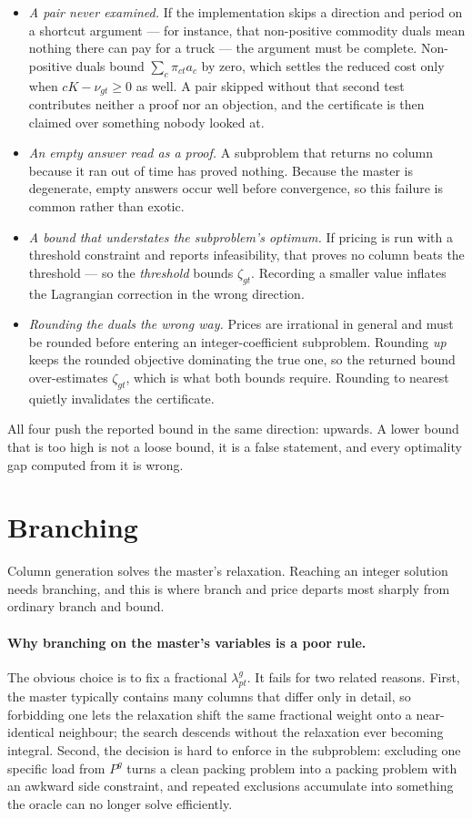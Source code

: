 \documentclass[11pt,a4paper]{article}
\begin{document}
\begin{itemize}[leftmargin=1.4em]
\item \emph{A pair never examined.} If the implementation skips a direction and
period on a shortcut argument --- for instance, that non-positive commodity
duals mean nothing there can pay for a truck --- the argument must be complete.
Non-positive duals bound $\sum_{c}\pi_{ct}a_{c}$ by zero, which settles the
reduced cost only when $cK-\nu_{gt}\ge 0$ as well. A pair skipped without that
second test contributes neither a proof nor an objection, and the certificate is
then claimed over something nobody looked at.
\item \emph{An empty answer read as a proof.} A subproblem that returns no
column because it ran out of time has proved nothing. Because the master is
degenerate, empty answers occur well before convergence, so this failure is
common rather than exotic.
\item \emph{A bound that understates the subproblem's optimum.} If pricing is
run with a threshold constraint and reports infeasibility, that proves no column
beats the threshold --- so the \emph{threshold} bounds $\zeta_{gt}$. Recording a
smaller value inflates the Lagrangian correction in the wrong direction.
\item \emph{Rounding the duals the wrong way.} Prices are irrational in general
and must be rounded before entering an integer-coefficient subproblem. Rounding
\emph{up} keeps the rounded objective dominating the true one, so the returned
bound over-estimates $\zeta_{gt}$, which is what both bounds require. Rounding
to nearest quietly invalidates the certificate.
\end{itemize}

All four push the reported bound in the same direction: upwards. A lower bound
that is too high is not a loose bound, it is a false statement, and every
optimality gap computed from it is wrong.

\section{Branching}

Column generation solves the master's relaxation. Reaching an integer solution
needs branching, and this is where branch and price departs most sharply from
ordinary branch and bound.

\paragraph{Why branching on the master's variables is a poor rule.} The obvious
choice is to fix a fractional $\lambda^{g}_{pt}$. It fails for two related
reasons. First, the master typically contains many columns that differ only in
detail, so forbidding one lets the relaxation shift the same fractional weight
onto a near-identical neighbour; the search descends without the relaxation ever
becoming integral. Second, the decision is hard to enforce in the subproblem:
excluding one specific load from $P^{g}$ turns a clean packing problem into a
packing problem with an awkward side constraint, and repeated exclusions
accumulate into something the oracle can no longer solve efficiently.
\end{document}
